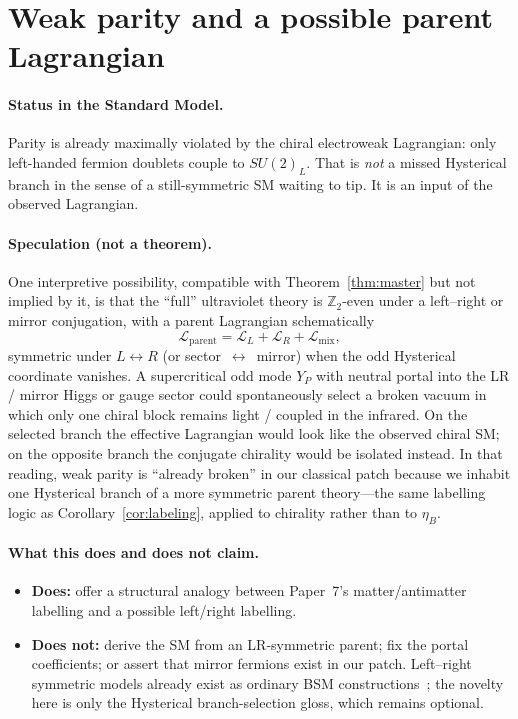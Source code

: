 \documentclass[11pt]{article}
\theoremstyle{definition}
\theoremstyle{remark}
\begin{document}
\section{Weak parity and a possible parent Lagrangian}
\label{sec:weakP}
\paragraph{Status in the Standard Model.}
Parity is already maximally violated by the chiral electroweak Lagrangian:
only left-handed fermion doublets couple to $SU(2)_L$.
That is \emph{not} a missed Hysterical branch in the sense of a still-symmetric
SM waiting to tip.
It is an input of the observed Lagrangian.

\paragraph{Speculation (not a theorem).}
\label{spec:parent}
One interpretive possibility, compatible with Theorem~\ref{thm:master} but not
implied by it, is that the ``full'' ultraviolet theory is $\mathbb Z_2$-even under
a left--right or mirror conjugation, with a parent Lagrangian schematically
\begin{equation}
\label{eq:parent}
\mathcal L_{\mathrm{parent}}
=
\mathcal L_{L}+\mathcal L_{R}+\mathcal L_{\mathrm{mix}},
\end{equation}
symmetric under $L\leftrightarrow R$ (or sector~$\leftrightarrow$~mirror) when
the odd Hysterical coordinate vanishes.
A supercritical odd mode $Y_P$ with neutral portal into the LR / mirror Higgs or
gauge sector could spontaneously select a broken vacuum in which only one chiral
block remains light / coupled in the infrared.
On the selected branch the effective Lagrangian would look like the observed
chiral SM; on the opposite branch the conjugate chirality would be isolated
instead.
In that reading, weak parity is ``already broken'' in our classical patch
because we inhabit one Hysterical branch of a more symmetric parent theory---the
same labelling logic as Corollary~\ref{cor:labeling}, applied to chirality
rather than to $\eta_B$.

\paragraph{What this does and does not claim.}
\begin{itemize}
\item \textbf{Does:} offer a structural analogy between Paper~7's
matter/antimatter labelling and a possible left/right labelling.
\item \textbf{Does not:} derive the SM from an LR-symmetric parent; fix the
portal coefficients; or assert that mirror fermions exist in our patch.
Left--right symmetric models already exist as ordinary BSM
constructions~\cite{MohapatraSenjanovic1975,Senjanovic1975}; the novelty here is
only the Hysterical branch-selection gloss, which remains optional.
\end{itemize}
\end{document}
